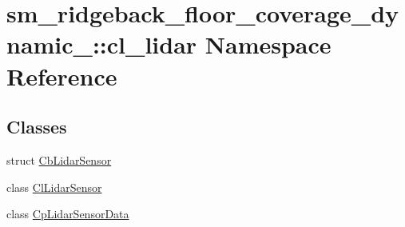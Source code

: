\hypertarget{namespacesm__ridgeback__floor__coverage__dynamic__1_1_1cl__lidar}{}\section{sm\+\_\+ridgeback\+\_\+floor\+\_\+coverage\+\_\+dynamic\+\_\+:\+:cl\+\_\+lidar Namespace Reference}
\label{namespacesm__ridgeback__floor__coverage__dynamic__1_1_1cl__lidar}
\subsection*{Classes}
\begin{DoxyCompactItemize}
\item 
struct \hyperlink{structsm__ridgeback__floor__coverage__dynamic__1_1_1cl__lidar_1_1CbLidarSensor}{Cb\+Lidar\+Sensor}
\item 
class \hyperlink{classsm__ridgeback__floor__coverage__dynamic__1_1_1cl__lidar_1_1ClLidarSensor}{Cl\+Lidar\+Sensor}
\item 
class \hyperlink{classsm__ridgeback__floor__coverage__dynamic__1_1_1cl__lidar_1_1CpLidarSensorData}{Cp\+Lidar\+Sensor\+Data}
\end{DoxyCompactItemize}

